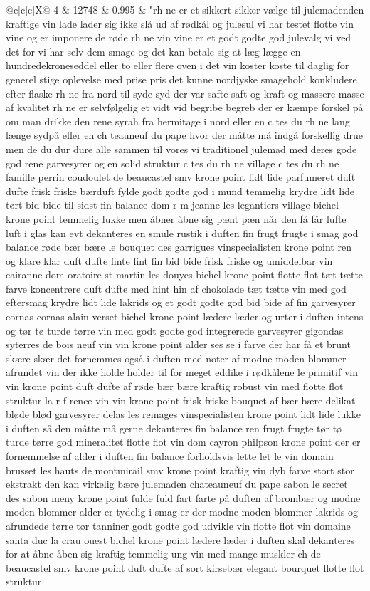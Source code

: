 \begin{xltabular}{\linewidth}{@{}c|c|c|X@{}}
		4 & 12748 & 0.995 & "rh ne er et sikkert sikker vælge til julemadenden kraftige vin lade lader sig ikke slå ud af rødkål og julesul vi har testet flotte vin vine og er imponere de røde rh ne vin vine er et godt godte god julevalg vi ved det for vi har selv dem smage og det kan betale sig at læg lægge en hundredekroneseddel eller to eller flere oven i det vin koster koste til daglig for generel stige oplevelse med prise pris det kunne nordjyske smagehold konkludere efter flaske rh ne fra nord til syde syd der var safte saft og kraft og massere masse af kvalitet rh ne er selvfølgelig et vidt vid begribe begreb der er kæmpe forskel på om man drikke den rene syrah fra hermitage i nord eller en c tes du rh ne lang længe sydpå eller en ch teauneuf du pape hvor der måtte må indgå forskellig drue men de du dur dure alle sammen til vores vi traditionel julemad med deres gode god rene garvesyrer og en solid struktur c tes du rh ne village c tes du rh ne famille perrin coudoulet de beaucastel smv krone point lidt lide parfumeret duft dufte frisk friske bærduft fylde godt godte god i mund temmelig krydre lidt lide tørt bid bide til sidst fin balance dom r m jeanne les legantiers village bichel krone point temmelig lukke men åbner åbne sig pænt pæn når den få får lufte luft i glas kan evt dekanteres en smule rustik i duften fin frugt frugte i smag god balance røde bær bære le bouquet des garrigues vinspecialisten krone point ren og klare klar duft dufte finte fint fin bid bide frisk friske og umiddelbar vin cairanne dom oratoire st martin les douyes bichel krone point flotte flot tæt tætte farve koncentrere duft dufte med hint hin af chokolade tæt tætte vin med god eftersmag krydre lidt lide lakrids og et godt godte god bid bide af fin garvesyrer cornas cornas alain verset bichel krone point lædere læder og urter i duften intens og tør tø turde tørre vin med godt godte god integrerede garvesyrer gigondas syterres de bois neuf vin vin krone point alder ses se i farve der har få et brunt skære skær det fornemmes også i duften med noter af modne moden blommer afrundet vin der ikke holde holder til for meget eddike i rødkålene le primitif vin vin krone point duft dufte af røde bær bære kraftig robust vin med flotte flot struktur la r f rence vin vin krone point frisk friske bouquet af bær bære delikat bløde blød garvesyrer delas les reinages vinspecialisten krone point lidt lide lukke i duften så den måtte må gerne dekanteres fin balance ren frugt frugte tør tø turde tørre god mineralitet flotte flot vin dom cayron philpson krone point der er fornemmelse af alder i duften fin balance forholdsvis lette let le vin domain brusset les hauts de montmirail smv krone point kraftig vin dyb farve stort stor ekstrakt den kan virkelig bære julemaden chateauneuf du pape sabon le secret des sabon meny krone point fulde fuld fart farte på duften af brombær og modne moden blommer alder er tydelig i smag er der modne moden blommer lakrids og afrundede tørre tør tanniner godt godte god udvikle vin flotte flot vin domaine santa duc la crau ouest bichel krone point lædere læder i duften skal dekanteres for at åbne åben sig kraftig temmelig ung vin med mange muskler ch de beaucastel smv krone point duft dufte af sort kirsebær elegant bourquet flotte flot struktur 
\end{xltabular}
